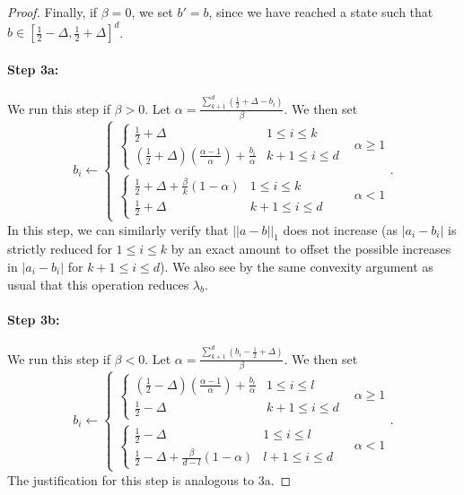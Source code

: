 \begin{proof}
Finally, if $\beta = 0$, we set $b' = b$, since we have reached a state such that $b \in [\frac{1}{2} - \Delta, \frac{1}{2} + \Delta]^d$. 

\paragraph{Step 3a:} We run this step if $\beta > 0$. Let $\alpha = \frac{\sum_{k+1}^d (\frac{1}{2} + \Delta - b_i)}{\beta}$. We then set  $$b_i \leftarrow  \begin{cases} \begin{cases} \frac{1}{2} + \Delta & 1 \leq i \leq k \\ (\frac{1}{2} + \Delta)(\frac{\alpha - 1}{\alpha}) + \frac{b_i}{\alpha} & k+1 \leq i \leq d \end{cases} & \alpha \geq 1 \\\begin{cases} \frac{1}{2} + \Delta + \frac{\beta}{k}(1 - \alpha) & 1 \leq i \leq k \\ \frac{1}{2} + \Delta & k+1 \leq i \leq d \end{cases} & \alpha < 1\end{cases}.$$ In this step, we can similarly verify that $||a - b||_1$ does not increase (as $|a_i - b_i|$ is strictly reduced for $1 \leq i \leq k$ by an exact amount to offset the possible increases in $|a_i - b_i|$ for $k+1 \leq i \leq d$). We also see by the same convexity argument as usual that this operation reduces $\lambda_b$. 

\paragraph{Step 3b:} We run this step if $\beta < 0$. Let $\alpha = \frac{\sum_{k+1}^d (b_i - \frac{1}{2} + \Delta)}{\beta}$. We then set  $$b_i \leftarrow  \begin{cases} \begin{cases} (\frac{1}{2} - \Delta)(\frac{\alpha - 1}{\alpha}) + \frac{b_i}{
\alpha} & 1 \leq i \leq l \\ \frac{1}{2} - \Delta & k+1 \leq i \leq d \end{cases} & \alpha \geq 1 \\\begin{cases} \frac{1}{2} - \Delta & 1 \leq i \leq l \\ \frac{1}{2} - \Delta + \frac{\beta}{d-l}(1-\alpha) & l+1 \leq i \leq d \end{cases} & \alpha < 1\end{cases}.$$ The justification for this step is analogous to 3a.


\end{proof}
